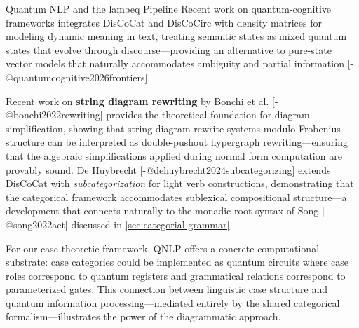 \documentclass[
  ignorenonframetext,
]{beamer}
\begin{document}
\begin{frame}{Quantum NLP and the lambeq Pipeline}
Recent work on quantum-cognitive frameworks integrates DisCoCat and
DisCoCirc with density matrices for modeling dynamic meaning in text,
treating semantic states as mixed quantum states that evolve through
discourse---providing an alternative to pure-state vector models that
naturally accommodates ambiguity and partial information
{[}-@quantumcognitive2026frontiers{]}.

Recent work on \textbf{string diagram rewriting} by Bonchi et al.
{[}-@bonchi2022rewriting{]} provides the theoretical foundation for
diagram simplification, showing that string diagram rewrite systems
modulo Frobenius structure can be interpreted as double-pushout
hypergraph rewriting---ensuring that the algebraic simplifications
applied during normal form computation are provably sound. De Huybrecht
{[}-@dehuybrecht2024subcategorizing{]} extends DisCoCat with
\emph{subcategorization} for light verb constructions, demonstrating
that the categorical framework accommodates sublexical compositional
structure---a development that connects naturally to the monadic root
syntax of Song {[}-@song2022act{]} discussed in
\autoref{sec:categorial-grammar}.

For our case-theoretic framework, QNLP offers a concrete computational
substrate: case categories could be implemented as quantum circuits
where case roles correspond to quantum registers and grammatical
relations correspond to parameterized gates. This connection between
linguistic case structure and quantum information processing---mediated
entirely by the shared categorical formalism---illustrates the power of
the diagrammatic approach.

\newpage
\end{frame}
\end{document}
